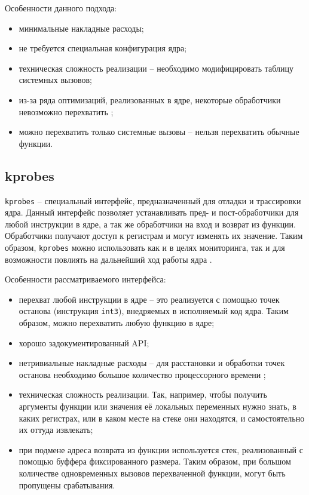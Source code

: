 Особенности данного подхода:

\begin{itemize}
	\item минимальные накладные расходы;
	\item не требуется специальная конфигурация ядра;
	\item техническая сложность реализации -- необходимо модифицировать таблицу системных вызовов;
	\item из-за ряда оптимизаций, реализованных в ядре, некоторые обработчики невозможно перехватить \cite{habr-profiling-linux};
	\item можно перехватить только системные вызовы -- нельзя перехватить обычные функции.
\end{itemize}

\subsection{kprobes}

\texttt{kprobes} \cite{kprobes} -- специальный интерфейс, предназначенный для отладки и трассировки ядра. Данный интерфейс позволяет устанавливать пред- и пост-обработчики для любой инструкции в ядре, а так же обработчики на вход и возврат из функции. Обработчики получают доступ к регистрам и могут изменять их значение. Таким образом, \texttt{kprobes} можно использовать как и в целях мониторинга, так и для возможности повлиять на дальнейший ход работы ядра \cite{habr-profiling-linux}.

Особенности рассматриваемого интерфейса:

\begin{itemize}
	\item перехват любой инструкции в ядре -- это реализуется с помощью точек останова (инструкция \texttt{int3}), внедряемых в исполняемый код ядра. Таким образом, можно перехватить любую функцию в ядре;
	\item хорошо задокументированный API;
	\item нетривиальные накладные расходы -- для расстановки и обработки точек останова необходимо большое количество процессорного времени \cite{habr-profiling-linux};
	\item техническая сложность реализации. Так, например, чтобы получить аргументы функции или значения её локальных переменных нужно знать, в каких регистрах, или в каком месте на стеке они находятся, и самостоятельно их оттуда извлекать;
	\item при подмене адреса возврата из функции используется стек, реализованный с помощью буффера фиксированного размера. Таким образом, при большом количестве одновременных вызовов перехваченной функции, могут быть пропущены срабатывания.
\end{itemize}


